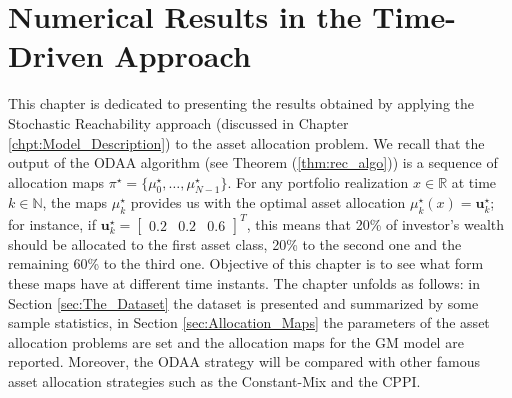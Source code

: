 \chapter{Numerical Results in the Time-Driven Approach}\label{chpt:NumResTD}
This chapter is dedicated to presenting the results obtained by applying the Stochastic Reachability approach (discussed in Chapter \ref{chpt:Model_Description}) to the asset allocation problem. We recall that the output of the \gls{ODAA} algorithm (see Theorem (\ref{thm:rec_algo})) is a sequence of allocation maps $\pi^{\star}=\{\mu_0^{\star},\ldots,\mu_{N-1}^{\star}\}$. For any portfolio realization $x \in \mathbb{R}$ at time $k \in \mathbb{N}$, the maps $\mu_k^{\star}$ provides us with the optimal asset allocation $\mu_k^{\star}(x)=\bm{u}_k^{\star}$; for instance, if $\bm{u}_k^{\star}= \begin{bmatrix}
0.2 & 0.2 & 0.6
\end{bmatrix}^T$, this means that 20\% of investor's wealth should be allocated to the first asset class, 20\% to the second one and the remaining 60\% to the third one. Objective of this chapter is to see what form these maps have at different time instants. The chapter unfolds as follows: in Section \ref{sec:The_Dataset} the dataset is presented and summarized by some sample statistics, in Section \ref{sec:Allocation_Maps} the parameters of the asset allocation problems are set and the allocation maps for the \gls{GM} model are reported. Moreover, the \gls{ODAA} strategy will be compared with other famous asset allocation strategies such as the Constant-Mix and the \gls{CPPI}.

